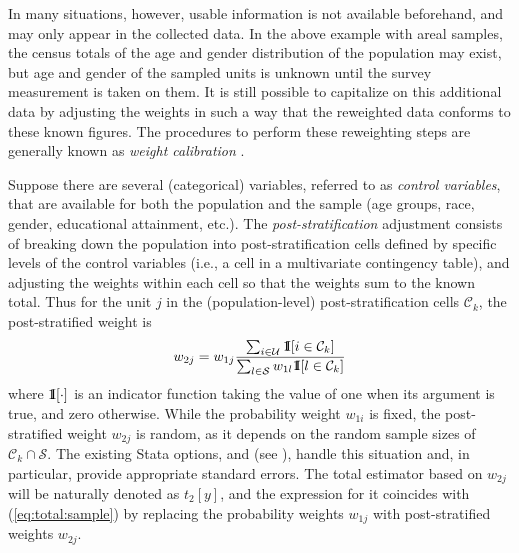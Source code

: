 In many situations, however, usable information is not available beforehand,
and may only appear in the collected data. In the above example with
areal samples, the census totals of the age and gender
distribution of the population may exist, but age and gender of 
the sampled units is unknown until the survey measurement is taken on them.
It is still possible to capitalize on this additional data by
adjusting the weights in such a way that the reweighted data
conforms to these known figures. The procedures to perform these
reweighting steps are generally known as {\it weight calibration}
\citep{deville:sarndal:1992,deville:sarndal:sautory:1993,%
kott:2006,kott:2009,sarndal:2007}.

Suppose there are several (categorical) variables, referred to
as {\it control variables}, that are available for both
the population and the sample
(age groups, race, gender, educational attainment, etc.).
The {\it post-stratification} adjustment consists of breaking down
the population into post-stratification cells defined
by specific levels of the control variables (i.e., a cell in a multivariate
contingency table), and adjusting the weights within each cell
so that the weights sum to the known total.
Thus for the unit $j$ in the (population-level) post-stratification
cells $\mathcal{C}_k$, the post-stratified weight is
\begin{equation}
   w_{2j} = w_{1j} \frac%
        {\sum_{i \in \mathcal{U}} \One[i \in \mathcal{C}_k]}%
        {\sum_{l \in \mathcal{S}} w_{1l} \One[l \in \mathcal{C}_k]}%
   \label{eq:ps:weight}
\end{equation}
where ${\rm 1\kern-.3em I}[\cdot]$ is an indicator function taking the value of one
when its argument is true, and zero otherwise.
While the probability weight $w_{1i}$ is fixed, the post-stratified weight
$w_{2j}$ is random, as it depends on the random sample sizes of
$\mathcal{C}_k \cap \mathcal{S}$.
The existing Stata  options,  and 
(see ), handle this situation and,
in particular, provide appropriate standard errors. The total estimator
based on $w_{2j}$ will be naturally denoted as $t_2[y]$, and the expression
for it coincides with (\ref{eq:total:sample}) by replacing the probability
weights $w_{1j}$ with post-stratified weights $w_{2j}$.


